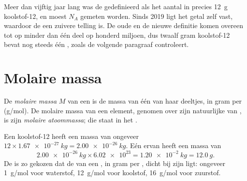 \begin{remark}\label{rem:g10:the-mole:origin}
Meer dan vijftig jaar lang was de  gedefinieerd als het aantal 
in precies \qty{12}{g} koolstof-12, en moest $N_A$ gemeten worden. Sinds
2019 ligt het getal zelf vast, waardoor de  een zuivere telling is.
De oude en de nieuwe definitie komen overeen tot op minder dan één deel
op honderd miljoen, dus twaalf gram koolstof-12 bevat nog steeds één 
, zoals de volgende paragraaf controleert.
\end{remark}

\section{Molaire massa}

\begin{definition}\label{def:g10:the-mole:molar-mass}
De \emph{molaire massa} $M$ van een 
is de massa van één  van haar deeltjes, in gram per 
(\si{g/mol}). De molaire massa van een element, genomen over zijn
natuurlijke  van , is zijn \emph{molaire
atoommassa}; die staat in het .
\end{definition}

\begin{example}\label{ex:g10:the-mole:carbon}
Een  koolstof-12 heeft een massa van ongeveer
$12 \times \qty{1.67e-27}{kg} = \qty{2.00e-26}{kg}$. Eén  ervan
heeft een massa van
\[
  \qty{2.00e-26}{kg} \times \num{6.02e23} = \qty{1.20e-2}{kg}
  = \qty{12.0}{g}.
\]
De  is zo gekozen dat de  van een , in gram per ,
dicht bij zijn  ligt: ongeveer \qty{1}{g/mol} voor waterstof,
\qty{12}{g/mol} voor koolstof, \qty{16}{g/mol} voor zuurstof.
\end{example}

